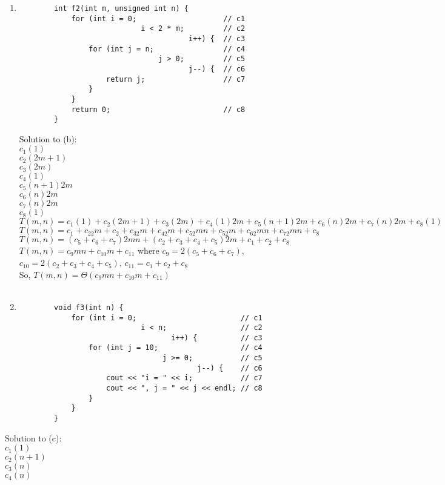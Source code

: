 \documentclass[12pt]{article}
\begin{document}
\begin{enumerate}
\begin{enumerate}
	\item	\begin{verbatim}
		int f2(int m, unsigned int n) {
		    for (int i = 0;                    // c1
		                    i < 2 * m;         // c2
		                               i++) {  // c3
		        for (int j = n;                // c4
		                        j > 0;         // c5
		                               j--) {  // c6
		            return j;                  // c7
		        }
		    }
		    return 0;                          // c8
		}
		\end{verbatim}            
	Solution to (b):
	\\$c_1(1)$
	\\$c_2(2m + 1)$
	\\$c_3(2m)$
	\\$c_4(1)$
	\\$c_5(n+1)2m$
	\\$c_6(n)2m$
	\\$c_7(n)2m$
	\\$c_8(1)$
	\\$T(m,n) = c_1(1) +c_2(2m+1)+c_3(2m)+c_4(1)2m+c_5(n+1)2m+c_6(n)2m+c_7(n)2m+c_8(1)$
	\\$T(m,n) = c_1 +c_22m+c_2+c_32m+c_42m+c_52mn+c_52m+c_62mn+c_72mn+c_8$
	\\$T(m,n) = (c_5+c_6+c_7)2mn+(c_2+c_3+c_4+c_5)2m+c_1+c_2+c_8$
	\\$T(m,n) = c_9mn+c_{10}m+c_{11}$ where $c_9 = 2(c_5+c_6+c_7)$, $c_{10} = 2(c_2+c_3+c_4+c_5)$, $c_{11} = c_1+c_2+c_8$
	\\So, $T(m,n) = \Theta(c_9mn+c_{10}m+c_{11})$
	\\\\	
	\item	\begin{verbatim}
		void f3(int n) {
		    for (int i = 0;                        // c1
		                    i < n;                 // c2
		                           i++) {          // c3
		        for (int j = 10;                   // c4
		                         j >= 0;           // c5
		                                 j--) {    // c6
		            cout << "i = " << i;           // c7
		            cout << ", j = " << j << endl; // c8
		        }
		    }
		}
		\end{verbatim}
	\end{enumerate}
	Solution to (c):
	\\$c_1(1)$
	\\$c_2(n+1)$
	\\$c_3(n)$
	\\$c_4(n)$

\end{enumerate}
\end{document}
